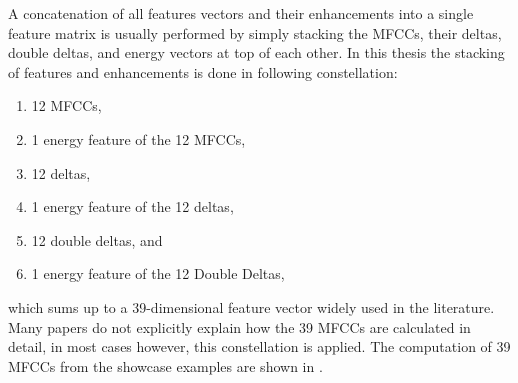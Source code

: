 A concatenation of all features vectors and their enhancements into a single feature matrix is usually performed by simply stacking the MFCCs, their deltas, double deltas, and energy vectors at top of each other.
In this thesis the stacking of features and enhancements is done in following constellation:
\begin{enumerate}
    \item 12 MFCCs,
    \item 1 energy feature of the 12 MFCCs,
    \item 12 deltas,
    \item 1 energy feature of the 12 deltas,
    \item 12 double deltas, and
    \item 1 energy feature of the 12 Double Deltas,
\end{enumerate}
which sums up to a 39-dimensional feature vector widely used in the literature.
Many papers do not explicitly explain how the 39 MFCCs are calculated in detail, in most cases however, this constellation is applied.
The computation of 39 MFCCs from the showcase examples are shown in .

